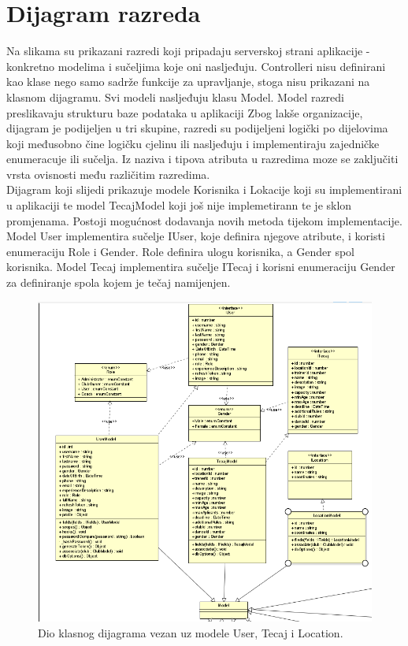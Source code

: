 			\eject
			
			
		\section{Dijagram razreda}
		
			\noindent Na slikama su prikazani razredi koji pripadaju serverskoj strani aplikacije - konkretno modelima i 
			sučeljima koje oni nasljeđuju. Controlleri nisu definirani kao klase nego samo sadrže funkcije za upravljanje, stoga nisu 
			prikazani na klasnom dijagramu.
			Svi modeli nasljeđuju klasu Model. Model razredi preslikavaju strukturu baze podataka u aplikaciji
			Zbog lakše organizacije, dijagram je podijeljen u tri skupine, razredi su podijeljeni logički po dijelovima koji međusobno čine 
			logičku cjelinu ili nasljeđuju i implementiraju zajedničke enumeracuje ili sučelja.
			Iz naziva i tipova atributa u razredima moze se zaključiti vrsta ovisnosti među različitim razredima. \\

			\noindent Dijagram koji slijedi prikazuje modele Korisnika i Lokacije koji su implementirani u aplikaciji te 
			model TecajModel koji još nije implemetirann te je sklon promjenama. Postoji mogućnost dodavanja novih metoda tijekom implementacije.
			Model User implementira sučelje IUser, koje definira njegove atribute, i koristi enumeraciju Role i Gender. Role definira ulogu korisnika, a
			Gender spol korisnika. Model Tecaj implementira sučelje ITecaj i korisni enumeraciju Gender za definiranje spola kojem je tečaj namijenjen.
			\\
			\begin{figure}[H]
				\includegraphics[scale=1.0]{slike/class1.png}
				\centering
				\caption{Dio klasnog dijagrama vezan uz modele User, Tecaj i Location.}
				\label{fig:class1}
			\end{figure}		
			
